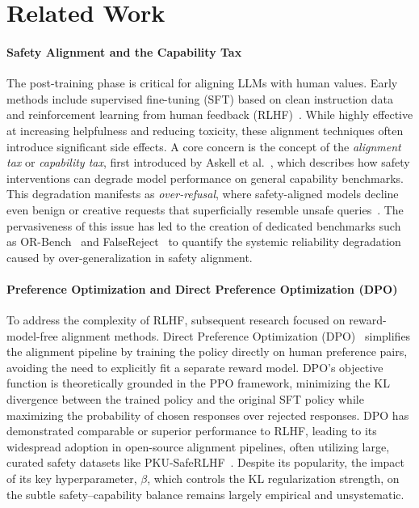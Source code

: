 \documentclass[a4paper, twocolumn, 9pt]{article}
\newcommand{\DPO}{\text{DPO}}
\begin{document}
\section{Related Work}

\paragraph{Safety Alignment and the Capability Tax}
The post-training phase is critical for aligning LLMs with human values. Early methods include supervised fine-tuning (SFT) based on clean instruction data and reinforcement learning from human feedback (RLHF)~\cite{rlhf}. While highly effective at increasing helpfulness and reducing toxicity, these alignment techniques often introduce significant side effects. A core concern is the concept of the \emph{alignment tax} or \emph{capability tax}, first introduced by Askell et al.~\cite{askell2021alignment}, which describes how safety interventions can degrade model performance on general capability benchmarks. This degradation manifests as \emph{over-refusal}, where safety-aligned models decline even benign or creative requests that superficially resemble unsafe queries~\cite{llm-overrefusal}. The pervasiveness of this issue has led to the creation of dedicated benchmarks such as OR-Bench~\cite{orbench} and FalseReject~\cite{falsereject} to quantify the systemic reliability degradation caused by over-generalization in safety alignment.

\paragraph{Preference Optimization and Direct Preference Optimization (DPO)}
To address the complexity of RLHF, subsequent research focused on reward-model-free alignment methods. Direct Preference Optimization ($\DPO$)~\cite{dpo} simplifies the alignment pipeline by training the policy directly on human preference pairs, avoiding the need to explicitly fit a separate reward model. $\DPO$'s objective function is theoretically grounded in the PPO framework, minimizing the KL divergence between the trained policy and the original SFT policy while maximizing the probability of chosen responses over rejected responses. DPO has demonstrated comparable or superior performance to RLHF, leading to its widespread adoption in open-source alignment pipelines, often utilizing large, curated safety datasets like PKU-SafeRLHF~\cite{pku-saferlhf}. Despite its popularity, the impact of its key hyperparameter, $\beta$, which controls the KL regularization strength, on the subtle safety--capability balance remains largely empirical and unsystematic.
\end{document}
